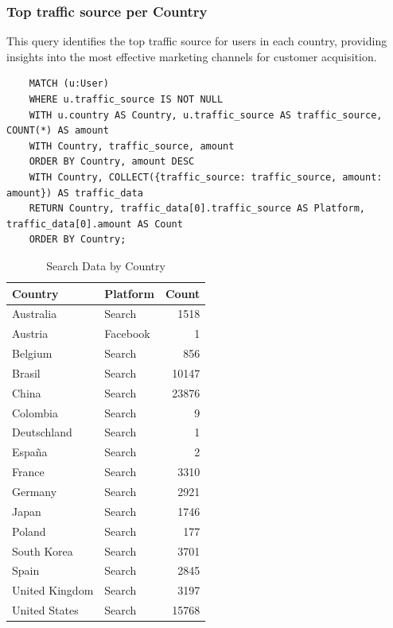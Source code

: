 \documentclass[a4paper,12pt]{article}
\begin{document}
  \subsubsection{Top traffic source per Country}
  This query identifies the top traffic source for users in each country, providing insights into the most effective marketing channels for customer acquisition.
  \begin{verbatim}
    MATCH (u:User)
    WHERE u.traffic_source IS NOT NULL
    WITH u.country AS Country, u.traffic_source AS traffic_source, COUNT(*) AS amount
    WITH Country, traffic_source, amount
    ORDER BY Country, amount DESC
    WITH Country, COLLECT({traffic_source: traffic_source, amount: amount}) AS traffic_data
    RETURN Country, traffic_data[0].traffic_source AS Platform, traffic_data[0].amount AS Count
    ORDER BY Country;
  \end{verbatim}  

  \begin{table}[h!]
    \centering
    \caption{Search Data by Country}
    \label{tab:search_data}
    \begin{tabular}{l l r}
        \toprule
        \textbf{Country} & \textbf{Platform} & \textbf{Count} \\
        \midrule
        Australia       & Search & 1518 \\
        Austria         & Facebook & 1 \\
        Belgium         & Search & 856 \\
        Brasil          & Search & 10147 \\
        China           & Search & 23876 \\
        Colombia        & Search & 9 \\
        Deutschland     & Search & 1 \\
        España          & Search & 2 \\
        France          & Search & 3310 \\
        Germany         & Search & 2921 \\
        Japan           & Search & 1746 \\
        Poland          & Search & 177 \\
        South Korea     & Search & 3701 \\
        Spain           & Search & 2845 \\
        United Kingdom  & Search & 3197 \\
        United States   & Search & 15768 \\
        \bottomrule
    \end{tabular}
\end{table}
\end{document}
